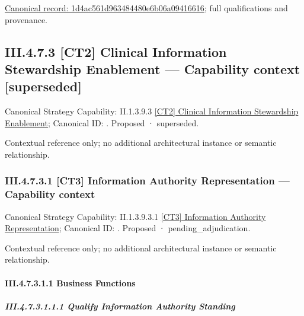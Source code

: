 {\footnotesize \href{../../../../continuum/business/business-function/1d4ac561d963484480e6b06a09416616.md}{Canonical record: 1d4ac561d963484480e6b06a09416616}; full qualifications and provenance.}\par
\subsection*{III.4.7.3 [CT2] Clinical Information Stewardship Enablement — Capability context [superseded]}
\label{navigation:III.4.7.3}

{\small Canonical Strategy Capability: II.1.3.9.3 \hyperref[element:3811c758ff2140c39a801bf89f75098a]{[CT2] Clinical Information Stewardship Enablement}; Canonical ID: \texttt{}. Proposed · superseded.}\par
Contextual reference only; no additional architectural instance or semantic relationship.\par
\subsubsection*{III.4.7.3.1 [CT3] Information Authority Representation — Capability context}
\label{navigation:III.4.7.3.1}

{\small Canonical Strategy Capability: II.1.3.9.3.1 \hyperref[element:8c850faafb334f97a81a0b4cd8fdb65f]{[CT3] Information Authority Representation}; Canonical ID: \texttt{}. Proposed · pending\_adjudication.}\par
Contextual reference only; no additional architectural instance or semantic relationship.\par
\paragraph*{III.4.7.3.1.1 Business Functions}
\label{navigation:III.4.7.3.1.1}

\subparagraph*{III.4.7.3.1.1.1 Qualify Information Authority Standing}
\label{navigation:III.4.7.3.1.1.1}

